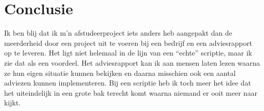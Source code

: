 \chapter{Conclusie}

Ik ben blij dat ik m'n afstudeerproject iets anders heb aangepakt dan de meerderheid door een project uit te voeren bij een bedrijf en een adviesrapport op te leveren. Het ligt niet helemaal in de lijn van een ``echte'' scriptie, maar ik zie dat als een voordeel. Het adviesrapport kan ik aan mensen laten lezen waarna ze hun eigen situatie kunnen bekijken en daarna misschien ook een aantal adviezen kunnen implementeren. Bij een scriptie heb ik toch meer het idee dat het uiteindelijk in een grote bak terecht komt waarna niemand er ooit meer naar kijkt.

